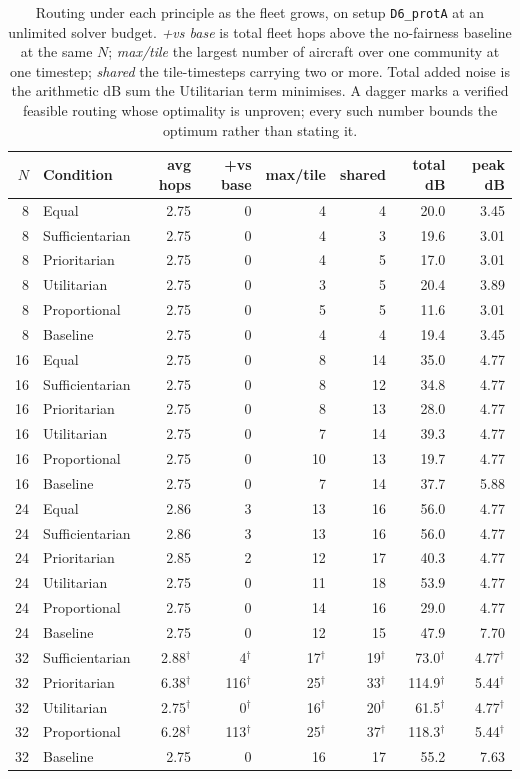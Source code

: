 \begin{table}[t]
\centering
\caption{Routing under each principle as the fleet grows, on setup \texttt{D6\_protA} at an unlimited solver budget. \emph{+vs base} is total fleet hops above the no-fairness baseline at the same $N$; \emph{max/tile} the largest number of aircraft over one community at one timestep; \emph{shared} the tile-timesteps carrying two or more. Total added noise is the arithmetic dB sum the Utilitarian term minimises. A dagger marks a verified feasible routing whose optimality is unproven; every such number bounds the optimum rather than stating it.}
\label{tab:fleet-main}
\begin{tabular}{r l rr rr rr}
\toprule
$N$ & Condition & avg hops & +vs base & max/tile & shared & total dB & peak dB \\
\midrule
8 & Equal & 2.75 & 0 & 4 & 4 & 20.0 & 3.45 \\
8 & Sufficientarian & 2.75 & 0 & 4 & 3 & 19.6 & 3.01 \\
8 & Prioritarian & 2.75 & 0 & 4 & 5 & 17.0 & 3.01 \\
8 & Utilitarian & 2.75 & 0 & 3 & 5 & 20.4 & 3.89 \\
8 & Proportional & 2.75 & 0 & 5 & 5 & 11.6 & 3.01 \\
8 & Baseline & 2.75 & 0 & 4 & 4 & 19.4 & 3.45 \\
\midrule
16 & Equal & 2.75 & 0 & 8 & 14 & 35.0 & 4.77 \\
16 & Sufficientarian & 2.75 & 0 & 8 & 12 & 34.8 & 4.77 \\
16 & Prioritarian & 2.75 & 0 & 8 & 13 & 28.0 & 4.77 \\
16 & Utilitarian & 2.75 & 0 & 7 & 14 & 39.3 & 4.77 \\
16 & Proportional & 2.75 & 0 & 10 & 13 & 19.7 & 4.77 \\
16 & Baseline & 2.75 & 0 & 7 & 14 & 37.7 & 5.88 \\
\midrule
24 & Equal & 2.86 & 3 & 13 & 16 & 56.0 & 4.77 \\
24 & Sufficientarian & 2.86 & 3 & 13 & 16 & 56.0 & 4.77 \\
24 & Prioritarian & 2.85 & 2 & 12 & 17 & 40.3 & 4.77 \\
24 & Utilitarian & 2.75 & 0 & 11 & 18 & 53.9 & 4.77 \\
24 & Proportional & 2.75 & 0 & 14 & 16 & 29.0 & 4.77 \\
24 & Baseline & 2.75 & 0 & 12 & 15 & 47.9 & 7.70 \\
\midrule
32 & Sufficientarian & 2.88$^\dagger$ & 4$^\dagger$ & 17$^\dagger$ & 19$^\dagger$ & 73.0$^\dagger$ & 4.77$^\dagger$ \\
32 & Prioritarian & 6.38$^\dagger$ & 116$^\dagger$ & 25$^\dagger$ & 33$^\dagger$ & 114.9$^\dagger$ & 5.44$^\dagger$ \\
32 & Utilitarian & 2.75$^\dagger$ & 0$^\dagger$ & 16$^\dagger$ & 20$^\dagger$ & 61.5$^\dagger$ & 4.77$^\dagger$ \\
32 & Proportional & 6.28$^\dagger$ & 113$^\dagger$ & 25$^\dagger$ & 37$^\dagger$ & 118.3$^\dagger$ & 5.44$^\dagger$ \\
32 & Baseline & 2.75 & 0 & 16 & 17 & 55.2 & 7.63 \\
\bottomrule
\end{tabular}
\end{table}
